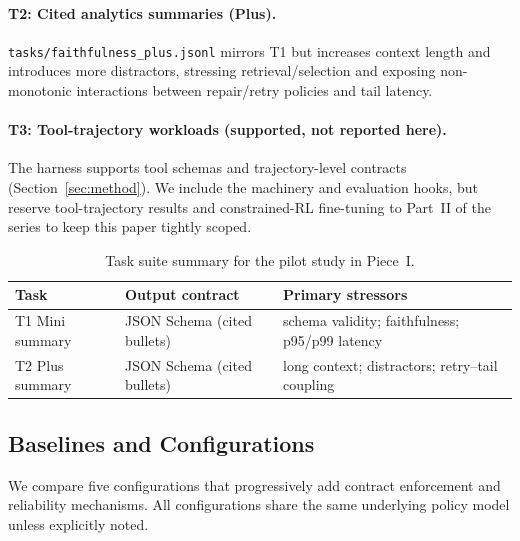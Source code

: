 \documentclass[11pt]{article}
\begin{document}
\paragraph{T2: Cited analytics summaries (Plus).}
\texttt{tasks/faithfulness\_plus.jsonl} mirrors T1 but increases context length and introduces more distractors, stressing retrieval/selection and exposing non-monotonic interactions between repair/retry policies and tail latency.

\paragraph{T3: Tool-trajectory workloads (supported, not reported here).}
The harness supports tool schemas and trajectory-level contracts (Section~\ref{sec:method}). We include the machinery and evaluation hooks, but reserve tool-trajectory results and constrained-RL fine-tuning to Part~II of the series to keep this paper tightly scoped.

\begin{table}[t]
\centering
\caption{Task suite summary for the pilot study in Piece~I.}
\label{tab:tasks}
\begin{tabularx}{\linewidth}{@{}l l X@{}}
\toprule
Task & Output contract & Primary stressors \\
\midrule
T1 Mini summary & JSON Schema (cited bullets) & schema validity; faithfulness; p95/p99 latency \\
T2 Plus summary & JSON Schema (cited bullets) & long context; distractors; retry--tail coupling \\
\bottomrule
\end{tabularx}
\end{table}


\subsection{Baselines and Configurations}
\label{sec:baselines-configs}

We compare five configurations that progressively add contract enforcement and reliability mechanisms.
All configurations share the same underlying policy model unless explicitly noted.
\end{document}
